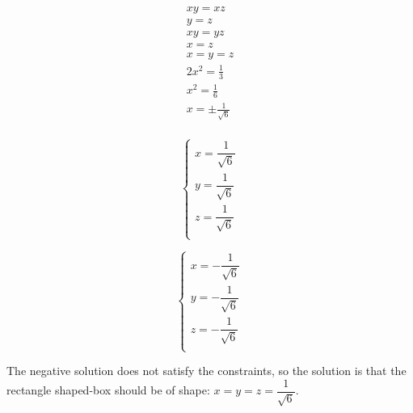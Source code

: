 \documentclass{article}
\begin{document}
\[
\begin{aligned}
xy = xz \\
y = z \\
xy = yz \\
x = z \\
x = y = z \\
2x^2 = \frac{1}{3} \\
x^2 = \frac{1}{6} \\
x = \pm \frac{1}{\sqrt{6}} \\
\end{aligned}
\]

\[
\begin{cases}
x = \dfrac{1}{\sqrt{6}} \\
y = \dfrac{1}{\sqrt{6}} \\
z = \dfrac{1}{\sqrt{6}} \\
\end{cases}
\]

\[
\begin{cases}
x = -\dfrac{1}{\sqrt{6}} \\
y = -\dfrac{1}{\sqrt{6}} \\
z = -\dfrac{1}{\sqrt{6}} \\
\end{cases}
\]

The negative solution does not satisfy the constraints, so the solution is that the rectangle shaped-box should be of shape: $x = y = z = \dfrac{1}{\sqrt{6}}$.
\end{document}
